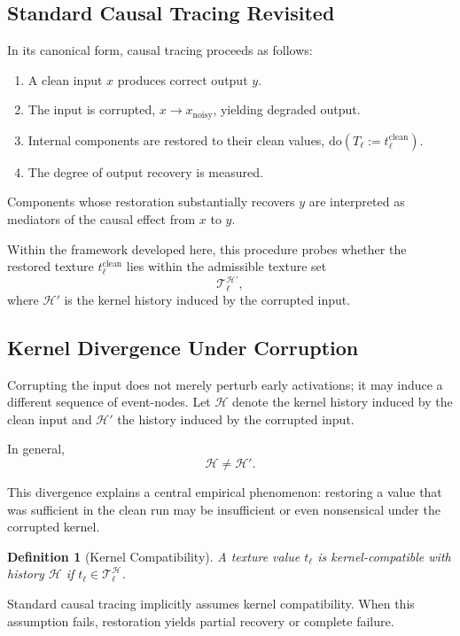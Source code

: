 \documentclass[11pt]{article}
\newtheorem{definition}{Definition}
\theoremstyle{remark}
\newcommand{\Hist}{\mathcal{H}}
\newcommand{\Do}{\mathrm{do}}
\begin{document}
\subsection{Standard Causal Tracing Revisited}

In its canonical form, causal tracing proceeds as follows:

\begin{enumerate}
\item A clean input $x$ produces correct output $y$.
\item The input is corrupted, $x \to x_{\text{noisy}}$, yielding degraded
output.
\item Internal components are restored to their clean values,
$\Do(T_\ell := t_\ell^{\text{clean}})$.
\item The degree of output recovery is measured.
\end{enumerate}

Components whose restoration substantially recovers $y$ are interpreted
as mediators of the causal effect from $x$ to $y$.

Within the framework developed here, this procedure probes whether the
restored texture $t_\ell^{\text{clean}}$ lies within the admissible
texture set
\[
\mathcal{T}_\ell^{\Hist'} ,
\]
where $\Hist'$ is the kernel history induced by the corrupted input.

\subsection{Kernel Divergence Under Corruption}

Corrupting the input does not merely perturb early activations; it may
induce a different sequence of event-nodes. Let $\Hist$ denote the
kernel history induced by the clean input and $\Hist'$ the history
induced by the corrupted input.

In general,
\[
\Hist \neq \Hist'.
\]

This divergence explains a central empirical phenomenon: restoring a
value that was sufficient in the clean run may be insufficient or even
nonsensical under the corrupted kernel.

\begin{definition}[Kernel Compatibility]
A texture value $t_\ell$ is \emph{kernel-compatible} with history $\Hist$
if $t_\ell \in \mathcal{T}_\ell^{\Hist}$.
\end{definition}

Standard causal tracing implicitly assumes kernel compatibility.
When this assumption fails, restoration yields partial recovery or
complete failure.
\end{document}
